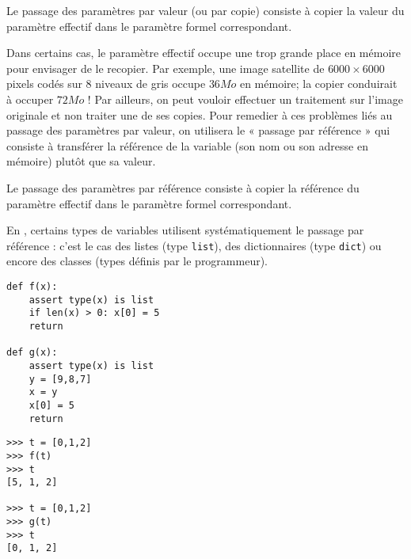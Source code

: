 \begin{defin}
Le passage des paramètres par valeur (ou par copie) consiste à copier la valeur
du paramètre effectif dans le paramètre formel correspondant.
\end{defin}

Dans certains cas, le paramètre effectif occupe une trop grande place en mémoire 
pour envisager de le recopier. Par exemple, une image satellite de $6000\times 6000$
pixels codés sur 8 niveaux de gris occupe $36 Mo$ en mémoire; la copier conduirait
à occuper $72 Mo$ ! Par ailleurs, on peut vouloir effectuer un traitement
sur l'image originale et non traiter une de ses copies. Pour remedier à ces
problèmes liés au passage des paramètres par valeur, on utilisera 
le « passage par référence » qui consiste à transférer
la référence de la variable (son nom ou son adresse en mémoire) plutôt que sa valeur.

\begin{defin}
Le passage des paramètres par référence consiste à copier la référence
du paramètre effectif dans le paramètre formel correspondant.
\end{defin}

En \python, certains types de  variables utilisent systématiquement
le passage par référence : c'est le cas des listes (type {\tt list}), 
des dictionnaires (type {\tt dict}) ou encore
des classes (types définis par le programmeur).

\noindent\mbox{}\hspace*{1cm}\begin{py}{6cm}
\begin{verbatim}
def f(x):
    assert type(x) is list
    if len(x) > 0: x[0] = 5
    return

def g(x):
    assert type(x) is list
    y = [9,8,7]
    x = y
    x[0] = 5
    return
\end{verbatim}
\end{py}
\hfill
\begin{py}{6cm}
\begin{verbatim}
>>> t = [0,1,2]
>>> f(t)
>>> t
[5, 1, 2]

>>> t = [0,1,2]
>>> g(t)
>>> t
[0, 1, 2]
\end{verbatim}
\end{py}
\hspace*{1cm}\mbox{}\vspace*{2mm}

